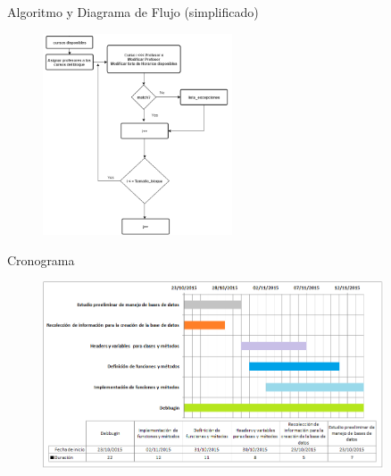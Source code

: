 \documentclass[10pt]{beamer}
\begin{document}
\begin{frame}{Algoritmo y Diagrama de Flujo (simplificado)}{}
\begin{block}{}


\begin{figure}[!h]
\centering
\includegraphics[width=0.50\textwidth]{./AAUgraphics/flux2.png}
\end{figure}

\end{block}
\end{frame}


\begin{frame}{Cronograma}{}
\begin{block}{}


\begin{figure}[!h]
\centering
\includegraphics[width=0.90\textwidth]{./AAUgraphics/ganttcolor.png}
\end{figure}

\end{block}
\end{frame}
\end{document}
